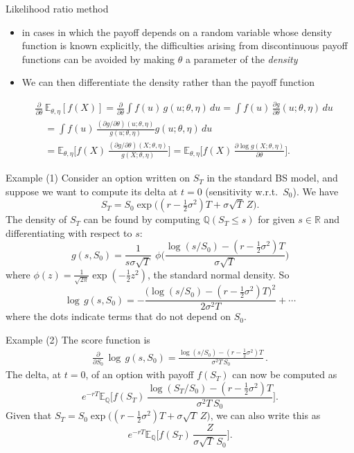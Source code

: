 \documentclass[pdf, handout]{beamer}
\begin{document}
\begin{frame}{Likelihood ratio method}
\begin{itemize}
\item
in cases in which the payoff depends on a random variable whose density function is known explicitly,
the difficulties arising from discontinuous payoff functions can be avoided by making $\theta$
a parameter of the \emph{density}
\item  We can then differentiate the density rather than the payoff function
\end{itemize}
\begin{align*}
& \frac{\partial}{\partial\theta} \, \mathbb{E}_{\theta,\eta}[f(X)] = \frac{\partial}{\partial\theta} \int f(u)\, g(u; \theta,\eta) \,du
= \int f(u) \, \frac{\partial g}{\partial \theta}(u;\theta,\eta) \,du \\
&\quad = \int f(u) \, \frac{(\partial g/\partial\theta)(u;\theta,\eta)}{g(u;\theta,\eta)} g(u;\theta,\eta) \, du \\
&\quad 
= \mathbb{E}_{\theta,\eta} \Bigg[f(X) \, \frac{(\partial g/\partial\theta)(X;\theta,\eta)}{g(X;\theta,\eta)}\Bigg] = \mathbb{E}_{\theta,\eta}\Bigg[f(X) \, \frac{\partial \log g(X;\theta, \eta)}{\partial \theta} \Bigg].
\end{align*}
\end{frame}

\begin{frame}{Example (1)}
Consider an option written on $S_T$ in the standard BS model, and suppose we want to
compute its delta at $t=0$ (sensitivity w.r.t.\ $S_0$). We have
$$
S_T = S_0 \exp\big( (r-\tfrac{1}{2}\sigma^2)T + \sigma\sqrt{T}\, Z \big).
$$
\pause
The density of $S_T$ can be found by computing $\mathbb{Q}(S_T \leq s)$ for given $s \in \mathbb{R}$ and
differentiating with respect to $s$:
$$
g(s,S_0) = \frac{1}{s\sigma\sqrt{T}} \,\,\phi\Bigg( \frac{\log(s/S_0) - (r-\frac{1}{2}\sigma^2)T}
{\sigma \sqrt{T}} \Bigg)
$$
where $\phi(z)=\frac{1}{\sqrt{2\pi}}\exp(-\tfrac{1}{2}z^2)$, the standard normal density.
\pause
So
$$
\log\, g(s,S_0) = -\frac{\big(\log(s/S_0) - (r-\frac{1}{2}\sigma^2)T\big)^2}
{2\sigma^2 T}  + \cdots
$$
where the dots indicate terms that do not depend on $S_0$.
\end{frame}

\begin{frame}{Example (2)}
\vskip2mm
The score function is
\begin{align*}
\frac{\partial}{\partial S_0} \, \log\, g(s,S_0)
= \frac{\log(s/S_0) - (r-\frac{1}{2}\sigma^2)T}{\sigma^2 T \, S_0}\,.
\end{align*}
\pause
The delta, at $t=0$, of an option with payoff $f(S_T)$ can now be computed as
$$
e^{-rT} \mathbb{E}_{\mathbb{Q}}\Bigg[ f(S_T) \, \frac{\log(S_T/S_0) - (r-\frac{1}{2}\sigma^2)T}{\sigma^2 T \, S_0}\Bigg].
$$
\pause
Given that $S_T = S_0 \exp\big( (r-\tfrac{1}{2}\sigma^2)T + \sigma\sqrt{T}\, Z \big)$,
we can also write this as
$$
e^{-rT} \mathbb{E}_{\mathbb{Q}}\Bigg[ f(S_T) \, \frac{Z}{\sigma \sqrt{T} \,S_0} \Bigg].
$$
\end{frame}
\end{document}
